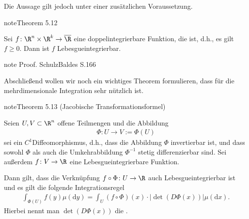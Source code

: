 \documentclass[letterpaper,10pt,english]{jupyterBook}
\begin{document}
\sphinxAtStartPar
Die Aussage gilt jedoch unter einer zusätzlichen Voraussetzung.
\label{masstheorie/integrationstechnik:theorem-6}
\begin{sphinxadmonition}{note}{Theorem 5.12}



\sphinxAtStartPar
Sei \(f \colon \R^{n} \times \R^k \rightarrow \overline{\R}\) eine doppelintegrierbare Funktion, die  ist, d.h., es gilt \(f \geq 0\).
Dann ist \(f\) Lebesgue\sphinxhyphen{}integrierbar.
\end{sphinxadmonition}

\begin{sphinxadmonition}{note}
\sphinxAtStartPar
Proof. Schulz\sphinxhyphen{}Baldes S.166
\end{sphinxadmonition}

\sphinxAtStartPar
Abschließend wollen wir noch ein wichtiges Theorem formulieren, dass für die mehrdimensionale Integration sehr nützlich ist.
\label{masstheorie/integrationstechnik:theorem-7}
\begin{sphinxadmonition}{note}{Theorem 5.13 (Jacobische Transformationsformel)}



\sphinxAtStartPar
Seien \(U, V \subset \R^n\) offene Teilmengen und die Abbildung
\begin{equation*}
\begin{split}\Phi \colon U \rightarrow V := \Phi(U)\end{split}
\end{equation*}
\sphinxAtStartPar
sei ein \(C^1\)\sphinxhyphen{}Diffeomorphismus, d.h., dass die Abbildung \(\Phi\) invertierbar ist, und dass sowohl \(\Phi\) als auch die Umkehrabbildung \(\Phi^{-1}\) stetig differenzierbar sind.
Sei außerdem \(f \colon V \rightarrow \R\) eine Lebesgue\sphinxhyphen{}integrierbare Funktion.

\sphinxAtStartPar
Dann gilt, dass die Verknüpfung \(f \circ \Phi \colon U \rightarrow \R\) auch Lebesgue\sphinxhyphen{}integrierbar ist und es gilt die folgende Integrationsregel
\begin{equation*}
\begin{split}\int_{\Phi(U)} f(y) \mu(\mathrm{d}y) = \int_U (f \circ \Phi)(x) \cdot |\det(D\Phi(x))|\mu(\mathrm{d}x). \end{split}
\end{equation*}
\sphinxAtStartPar
Hierbei nennt man \(\det(D\Phi(x))\) die .
\end{sphinxadmonition}
\end{document}

